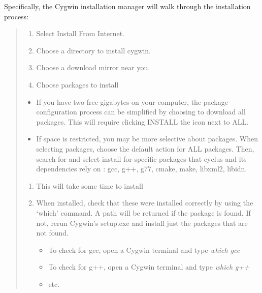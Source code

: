 \documentclass[letterpaper,10pt,english]{sphinxmanual}
\begin{document}
Specifically, the Cygwin installation manager will walk through the
installation process:
\begin{quote}
\begin{enumerate}
\item {} 
Select Install From Internet.

\item {} 
Choose a directory to install cygwin.

\item {} 
Choose a download mirror near you.

\item {} 
Choose packages to install

\end{enumerate}
\begin{itemize}
\item {} 
If you have two free gigabytes on your computer, the package
configuration process can be simplified by choosing to download all
packages. This will require clicking INSTALL the icon next to ALL.

\item {} 
If space is restricted, you may be more selective about packages. When
selecting packages, choose the default action for ALL packages. Then,
search for and select install for specific packages that cyclus and its
dependencies rely on : gcc, g++, g77, cmake, make, libxml2,
libidn.

\end{itemize}
\begin{enumerate}
\item {} 
This will take some time to install

\item {} 
When installed, check that these were installed correctly by using the
`which' command. A path will be returned if the package is found. If not,
rerun Cygwin's setup.exe and install just the packages that are not found.
\begin{itemize}
\item {} 
To check for gcc, open a Cygwin terminal and type \emph{which gcc}

\item {} 
To check for g++, open a Cygwin terminal and type \emph{which g++}

\item {} 
etc.

\end{itemize}

\end{enumerate}
\end{quote}
\end{document}
